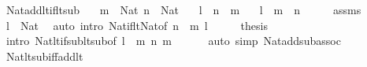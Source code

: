 \begin{isabellebody}
%
\endisadelimproof
\isanewline
{}\isamarkupfalse%
\ Nat{\isacharunderscore}{\kern0pt}add{\isacharunderscore}{\kern0pt}lt{\isacharunderscore}{\kern0pt}if{\isacharunderscore}{\kern0pt}lt{\isacharunderscore}{\kern0pt}sub{\isacharcolon}{\kern0pt}\isanewline
\ \ \ {\isachardoublequoteopen}m\ {\isacharcolon}{\kern0pt}\ Nat{\isachardoublequoteclose}\ {\isachardoublequoteopen}n\ {\isacharcolon}{\kern0pt}\ Nat{\isachardoublequoteclose}\isanewline
\ \ \ {\isachardoublequoteopen}l\ {\isacharless}{\kern0pt}\ n\ {\isacharminus}{\kern0pt}\ m{\isachardoublequoteclose}\isanewline
\ \ \ {\isachardoublequoteopen}l\ {\isacharplus}{\kern0pt}\ m\ {\isacharless}{\kern0pt}\ n{\isachardoublequoteclose}\isanewline
%
\isadelimproof
%
\endisadelimproof
%
\isatagproof
{}\isamarkupfalse%
\ {\isacharminus}{\kern0pt}\isanewline
\ \ \isamarkupfalse%
\ assms\ \isamarkupfalse%
\ {\isachardoublequoteopen}l\ {\isacharcolon}{\kern0pt}\ Nat{\isachardoublequoteclose}\ \isamarkupfalse%
\ {\isacharparenleft}{\kern0pt}auto\ intro{\isacharcolon}{\kern0pt}\ Nat{\isacharunderscore}{\kern0pt}if{\isacharunderscore}{\kern0pt}lt{\isacharunderscore}{\kern0pt}Nat{\isacharbrackleft}{\kern0pt}of\ {\isachardoublequoteopen}n\ {\isacharminus}{\kern0pt}\ m{\isachardoublequoteclose}\ l{\isacharbrackright}{\kern0pt}{\isacharparenright}{\kern0pt}\isanewline
\ \ \isamarkupfalse%
\ \isamarkupfalse%
\ {\isacharquery}{\kern0pt}thesis\ \isamarkupfalse%
\ {\isacharparenleft}{\kern0pt}intro\ Nat{\isacharunderscore}{\kern0pt}lt{\isacharunderscore}{\kern0pt}if{\isacharunderscore}{\kern0pt}sub{\isacharunderscore}{\kern0pt}lt{\isacharunderscore}{\kern0pt}sub{\isacharbrackleft}{\kern0pt}of\ {\isachardoublequoteopen}l\ {\isacharplus}{\kern0pt}\ m{\isachardoublequoteclose}\ {\isachardoublequoteopen}n{\isachardoublequoteclose}\ m{\isacharbrackright}{\kern0pt}{\isacharparenright}{\kern0pt}\isanewline
\ \ \ \ \ \ {\isacharparenleft}{\kern0pt}auto\ simp{\isacharcolon}{\kern0pt}\ Nat{\isacharunderscore}{\kern0pt}add{\isacharunderscore}{\kern0pt}sub{\isacharunderscore}{\kern0pt}assoc{\isacharparenright}{\kern0pt}\isanewline
{}\isamarkupfalse%
%
\endisatagproof
{\isafoldproof}%
%
\isadelimproof
\isanewline
%
\endisadelimproof
\isanewline
{}\isamarkupfalse%
\ Nat{\isacharunderscore}{\kern0pt}lt{\isacharunderscore}{\kern0pt}sub{\isacharunderscore}{\kern0pt}iff{\isacharunderscore}{\kern0pt}add{\isacharunderscore}{\kern0pt}lt{\isacharcolon}{\kern0pt}\isanewline

\end{isabellebody}
